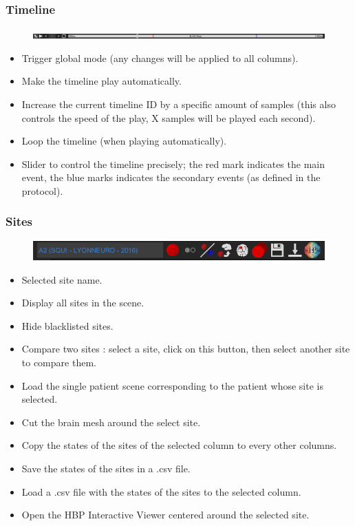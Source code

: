 \documentclass[a4paper]{article}
\begin{document}
\subsubsection{Timeline}
\begin{figure}[H]
\begin{center}
\includegraphics[scale=0.3]{Timeline.png}
\end{center}
\end{figure}
\begin{itemize}
\item Trigger global mode (any changes will be applied to all columns).
\item Make the timeline play automatically.
\item Increase the current timeline ID by a specific amount of samples (this also controls the speed of the play, X samples will be played each second).
\item Loop the timeline (when playing automatically).
\item Slider to control the timeline precisely; the red mark indicates the main event, the blue marks indicates the secondary events (as defined in the protocol).
\end{itemize}
\subsubsection{Sites}
\begin{figure}[H]
\begin{center}
\includegraphics[scale=0.5]{Sites.png}
\end{center}
\end{figure}
\begin{itemize}
\item Selected site name.
\item Display all sites in the scene.
\item Hide blacklisted sites.
\item Compare two sites : select a site, click on this button, then select another site to compare them.
\item Load the single patient scene corresponding to the patient whose site is selected.
\item Cut the brain mesh around the select site.
\item Copy the states of the sites of the selected column to every other columns.
\item Save the states of the sites in a .csv file.
\item Load a .csv file with the states of the sites to the selected column.
\item Open the HBP Interactive Viewer centered around the selected site.
\end{itemize}
\end{document}
